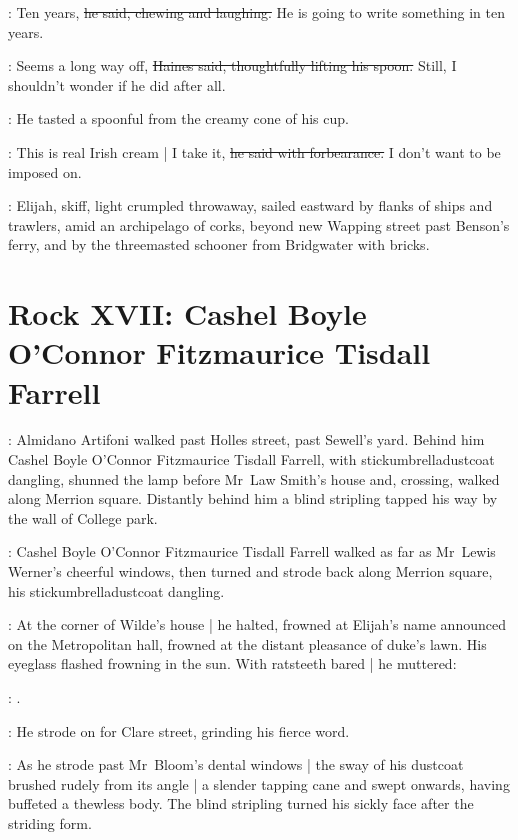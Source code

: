 \mulligan:
Ten years,
\sout{he said,
chewing and laughing.}
He is going to write something in ten years.%

\haines:
Seems a long way off,
\sout{Haines said,
thoughtfully lifting his spoon.}
Still, I shouldn't wonder if he did after all.

:
He tasted a spoonful from the creamy cone of his cup.

\haines:
This is real Irish cream |
I take it,
\sout{he said with forbearance.}
I don't want to be imposed on.

\begin{interject}
    :
    Elijah,
    skiff,
    light crumpled throwaway,
    sailed eastward by flanks of
    ships and trawlers,
    amid an archipelago of corks,
    beyond new Wapping street
    past Benson's ferry,
    and by the threemasted schooner  from
    Bridgwater with bricks.
\end{interject}


\section*{Rock XVII: Cashel Boyle O'Connor Fitzmaurice Tisdall Farrell}

:
Almidano Artifoni walked past Holles street,%
past Sewell's yard.
Behind him
Cashel Boyle O'Connor Fitzmaurice Tisdall Farrell,
with stick\-umbrella\-dust\-coat dangling,
shunned the lamp before Mr~Law Smith's house
and, crossing, walked along Merrion square.
Distantly behind him
a blind stripling tapped his way
by the wall of College park.

:
Cashel Boyle O'Connor Fitzmaurice Tisdall Farrell
walked as far as
Mr~Lewis Werner's cheerful windows,
then turned and strode back along Merrion square,
his stick\-umbrella\-dust\-coat dangling.

:
At the corner of Wilde's house |
he halted,
frowned at Elijah's name announced on the Metropolitan hall,%
frowned at the distant pleasance of duke's lawn.
His eyeglass flashed frowning in the sun.
With ratsteeth bared |
he muttered:

\cashel:
.

:
He strode on for Clare street,
grinding his fierce word.

:
As he strode past Mr~Bloom's dental windows |
the sway of his dustcoat brushed rudely from its angle |
a slender tapping cane and swept onwards,
having buffeted a thewless body.
The blind stripling turned his sickly face after the striding form.

